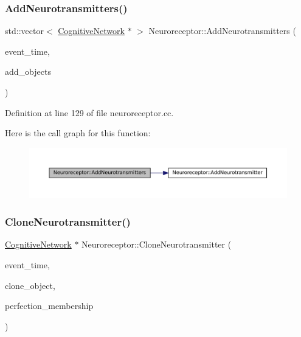 \subsubsection{\texorpdfstring{Add\+Neurotransmitters()}{AddNeurotransmitters()}}
{\footnotesize\ttfamily std\+::vector$<$ \mbox{\hyperlink{class_cognitive_network}{Cognitive\+Network}} $\ast$ $>$ Neuroreceptor\+::\+Add\+Neurotransmitters (\begin{DoxyParamCaption}\item[{std\+::chrono\+::time\+\_\+point$<$ \mbox{\hyperlink{universe_8h_a0ef8d951d1ca5ab3cfaf7ab4c7a6fd80}{Clock}} $>$}]{event\+\_\+time,  }\item[{std\+::vector$<$ \mbox{\hyperlink{class_cognitive_network}{Cognitive\+Network}} $\ast$$>$}]{add\+\_\+objects }\end{DoxyParamCaption})}



Definition at line 129 of file neuroreceptor.\+cc.

Here is the call graph for this function\+:\nopagebreak
\begin{figure}[H]
\begin{center}
\leavevmode
\includegraphics[width=350pt]{class_neuroreceptor_a2e4cbd9debd555091923f57f8aa11fe4_cgraph}
\end{center}
\end{figure}
\mbox{\label{class_neuroreceptor_a5629a3d463cc963138ff017ec499720d}} 
\subsubsection{\texorpdfstring{Clone\+Neurotransmitter()}{CloneNeurotransmitter()}}
{\footnotesize\ttfamily \mbox{\hyperlink{class_cognitive_network}{Cognitive\+Network}} $\ast$ Neuroreceptor\+::\+Clone\+Neurotransmitter (\begin{DoxyParamCaption}\item[{std\+::chrono\+::time\+\_\+point$<$ \mbox{\hyperlink{universe_8h_a0ef8d951d1ca5ab3cfaf7ab4c7a6fd80}{Clock}} $>$}]{event\+\_\+time,  }\item[{\mbox{\hyperlink{class_cognitive_network}{Cognitive\+Network}} $\ast$}]{clone\+\_\+object,  }\item[{double}]{perfection\+\_\+membership }\end{DoxyParamCaption})}




